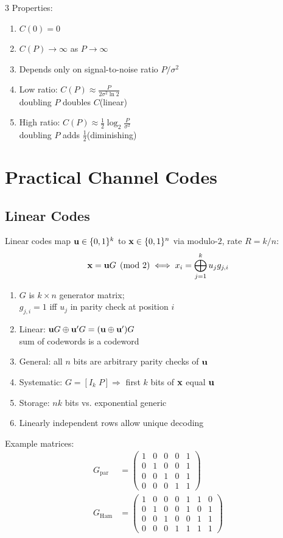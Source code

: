 \documentclass[12pt, a4paper]{article}
\begin{document}
\begin{multicols*}{3}
Properties:
\begin{enumerate}[\roman*.]
  \item $C(0)=0$
  \item $C(P)\to\infty$ as $P\to\infty$
  \item Depends only on signal-to-noise ratio $P/\sigma^2$
  \item Low ratio: $C(P)\approx\tfrac{P}{2\sigma^2\ln 2}$\\doubling $P$ doubles $C$\hfill(linear)
  \item High ratio: $C(P)\approx\tfrac{1}{2}\log_2\tfrac{P}{\sigma^2}$\\doubling $P$ adds $\tfrac{1}{2}$\hfill(diminishing)
\end{enumerate}
\colbreak
\colbreak
\section{Practical Channel Codes}
\subsection{Linear Codes}
Linear codes map $\mathbf{u}\in\{0,1\}^k$ to $\mathbf{x}\in\{0,1\}^n$ via modulo-$2$, rate $R=k/n$:
\begin{align*}
  \mathbf{x}=\mathbf{u} G\pmod{2}\iff x_i=\bigoplus_{j=1}^k u_j g_{j,i}
\end{align*}
\begin{enumerate}[\roman*.]
  \item $G$ is $k\times n$ generator matrix;\;\\$g_{j,i}=1$ iff $u_j$ in parity check at position $i$
  \item Linear: $\mathbf{u} G\oplus\mathbf{u}'G=(\mathbf{u}\oplus\mathbf{u}')G$\\sum of codewords is a codeword
  \item General: all $n$ bits are arbitrary parity checks of $\mathbf{u}$
  \item Systematic: $G=[I_k\;P]\Rightarrow$ first $k$ bits of $\mathbf{x}$ equal $\mathbf{u}$
  \item Storage: $nk$ bits vs. exponential generic
  \item Linearly independent rows allow unique decoding
\end{enumerate}

Example matrices:
\begin{align*}
  G_{\text{par}}&=\begin{pmatrix}
    1&0&0&0&1\\
    0&1&0&0&1\\
    0&0&1&0&1\\
    0&0&0&1&1
  \end{pmatrix}\\
  G_{\text{Ham}}&=\begin{pmatrix}
    1&0&0&0&1&1&0\\
    0&1&0&0&1&0&1\\
    0&0&1&0&0&1&1\\
    0&0&0&1&1&1&1
  \end{pmatrix}
\end{align*}


\end{multicols*}
\end{document}
